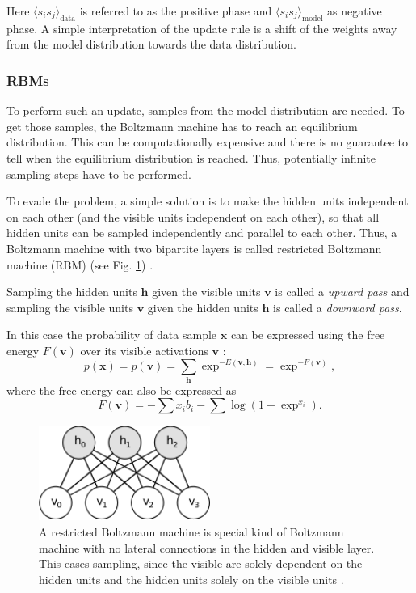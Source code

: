 Here $\langle s_i s_j \rangle_{\text{data}}$ is referred to as the positive phase and $ \langle s_i s_j \rangle_{\text{model}}$ as negative phase.
A simple interpretation of the update rule is a shift of the weights away from the model distribution towards the data distribution.

\subsubsection{RBMs} \label{c:rbms}

To perform such an update, samples from the model distribution are needed. 
To get those samples, the Boltzmann machine has to reach an equilibrium distribution. 
This can be computationally expensive and there is no guarantee to tell when the equilibrium distribution is reached.
Thus, potentially infinite sampling steps have to be performed.

To evade the problem, a simple solution is to make the hidden units independent on each other (and the visible units independent on each other), so that all hidden units can be sampled independently and parallel to each other.
Thus, a Boltzmann machine with two bipartite layers is called restricted Boltzmann machine (RBM) (see Fig. \ref{fig:rbm}) \cite{smolensky1986information}.

Sampling the hidden units $\textbf{h}$ given the visible units $\textbf{v}$ is called a \textit{upward pass} and sampling the visible units $\textbf{v}$ given the hidden units $\textbf{h}$ is called a \textit{downward pass}.

In this case the probability of data sample $\textbf{x}$ can be expressed using the free energy $F(\textbf{v})$ over its visible activations $\textbf{v}$ \cite{hinton2010practical}\cite{Fischer2014}:
\[
p(\textbf{x}) =  p(\textbf{v}) = \sum_{\textbf{h}} \exp^{-E(\textbf{v},\textbf{h})} = \exp^{-F(\textbf{v})},
\]
where the free energy can also be expressed as
\[
F(\textbf{v}) = - \sum x_i b_i - \sum \log(1 + \exp^{x_i})  .
\]

\begin{figure}
	\centering
    	\includegraphics[width=0.5\textwidth]{imgs/rbm.png} 
    \caption[A restricted Boltzmann machine with 7 units.]{A restricted Boltzmann machine is special kind of Boltzmann machine with no lateral connections in the hidden and visible layer. This eases sampling, since the visible are solely dependent on the hidden units and the hidden units solely on the visible units \cite{theanoRBM}.}
	\label{fig:rbm}
\end{figure}

